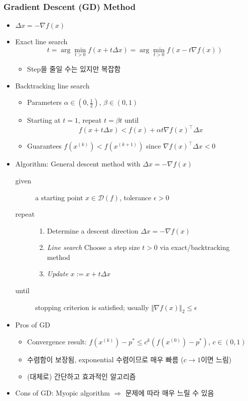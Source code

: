 \subsubsection*{Gradient Descent (GD) Method}
\begin{itemize}
    \item $\Delta x = -\nabla f(x)$
    \item Exact line search
    \begin{equation}
        t = \arg\min_{t>0}f(x+t\Delta x) = \arg\min_{t>0}f(x-t\nabla f(x))
    \end{equation}
    \begin{itemize}
        \item Step을 줄일 수는 있지만 복잡함
    \end{itemize}
    \item Backtracking line search
    \begin{itemize}
        \item Parameters $\alpha\in\left(0,\frac{1}{2}\right)$, $\beta\in(0,1)$
        \item Starting at $t=1$, repeat $t=\beta t$ until
        \begin{equation}
            f(x+t\Delta x) < f(x)+\alpha t\nabla f(x)^{\top}\Delta x
        \end{equation}
        \item Guarantees $f(x^{(k)})<f(x^{(k+1)})$ since $\nabla f(x)^{\top}\Delta x<0$
    \end{itemize}
    \item Algorithm: General descent method with $\Delta x = -\nabla f(x)$
    \begin{description}
        \item[given] a starting point $x\in\mathcal{D}(f)$, tolerance $\epsilon>0$
        \item[repeat] \phantom{}
        \begin{enumerate}
            \item Determine a descent direction $\Delta x=-\nabla f(x)$
            \item \textit{Line search} Choose a step size $t>0$ via exact/backtracking method
            \item \textit{Update} $x:=x+t\Delta x$
        \end{enumerate}
        \item[until] stopping criterion is satisfied; usually $\Vert\nabla f(x)\Vert_2\leq\epsilon$
    \end{description}
    \item Pros of GD
    \begin{itemize}
        \item Convergence result: $f(x^{(k)})-p^\ast\leq c^k\left(f(x^{(0)})-p^\ast\right)$, $c\in(0,1)$
        \item 수렴함이 보장됨, exponential 수렴이므로 매우 빠름 ($c\rightarrow 1$이면 느림)
        \item (대체로) 간단하고 효과적인 알고리즘
    \end{itemize}
    \item Cons of GD: Myopic algorithm $\Rightarrow$ 문제에 따라 매우 느릴 수 있음
\end{itemize}

